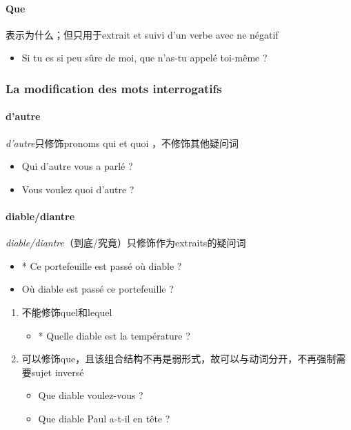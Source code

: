 \documentclass[UTF8]{report}
\begin{document}
\paragraph{Que}
表示为什么；但只用于extrait et suivi d’un verbe avec ne négatif
\begin{itemize}
    \item Si tu es si peu sûre de moi, que n’as-tu appelé toi-même ? 
\end{itemize}


\subsubsection{La modification des mots interrogatifs}

\paragraph{d’autre}
\textit{d’autre}只修饰pronoms qui et quoi ，不修饰其他疑问词
\begin{itemize}
    \item Qui d’autre vous a parlé ?
    \item Vous voulez quoi d’autre ?
\end{itemize}
\paragraph{diable/diantre}
\textit{diable/diantre}（到底/究竟）只修饰作为extraits的疑问词
\begin{itemize}
    \item * Ce portefeuille est passé où diable ?
    \item Où diable est passé ce portefeuille ?
\end{itemize}
\begin{enumerate}
    \item 不能修饰quel和lequel
    \begin{itemize}
        \item * Quelle diable est la température ?
    \end{itemize}
    \item 可以修饰que，且该组合结构不再是弱形式，故可以与动词分开，不再强制需要sujet inversé
    \begin{itemize}
        \item Que diable voulez-vous ?
        \item Que diable Paul a-t-il en tête ?
    \end{itemize}
\end{enumerate}
\end{document}
